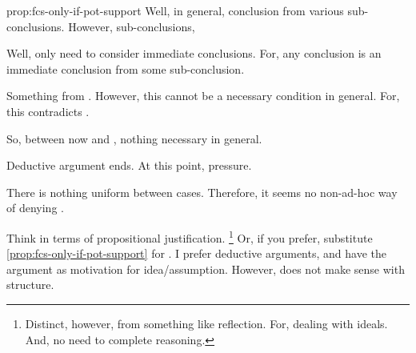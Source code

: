 \begin{note}
\begin{argument}{prop:fcs-only-if-pot-support}
    Well, in general, conclusion from various sub-conclusions.
    However, sub-conclusions,

    Well, only need to consider immediate conclusions.
    For, any conclusion is an immediate conclusion from some sub-conclusion.

    \smallskip
    Something from \pevent{}.
    However, this cannot be a necessary condition in general.
    For, this contradicts \supportII{}.

    So, between now and \pevent{}, nothing necessary in general.

    \smallskip
    Deductive argument ends.
    At this point, pressure.

    There is nothing uniform between cases.
    Therefore, it seems no non-ad-hoc way of denying \ros{}.
  \end{argument}

  Think in terms of propositional justification.%
  \footnote{
    Distinct, however, from something like reflection.
    For, dealing with ideals.
    And, no need to complete reasoning.
  }
  Or, if you prefer, substitute \autoref{prop:fcs-only-if-pot-support} for \supportII{}.
  I prefer deductive arguments, and have the argument as motivation for idea/assumption.
  However, does not make sense with structure.
\end{note}



